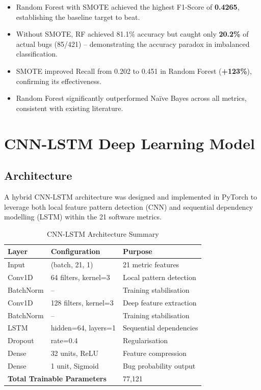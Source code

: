 \documentclass[12pt,a4paper]{article}
\begin{document}
\begin{itemize}[leftmargin=1.5cm]
  \item Random Forest with SMOTE achieved the highest F1-Score of
    \textbf{0.4265}, establishing the baseline target to beat.
  \item Without SMOTE, RF achieved 81.1\% accuracy but caught only
    \textbf{20.2\%} of actual bugs (85/421) -- demonstrating the
    accuracy paradox in imbalanced classification.
  \item SMOTE improved Recall from 0.202 to 0.451 in Random Forest
    (\textbf{+123\%}), confirming its effectiveness.
  \item Random Forest significantly outperformed Naïve Bayes across
    all metrics, consistent with existing literature.
\end{itemize}

\section{CNN-LSTM Deep Learning Model}

\subsection{Architecture}

A hybrid CNN-LSTM architecture was designed and implemented in PyTorch
to leverage both local feature pattern detection (CNN) and sequential
dependency modelling (LSTM) within the 21 software metrics.

\begin{table}[H]
  \centering
  \caption{CNN-LSTM Architecture Summary}
  \begin{tabular}{lll}
    \toprule
    \textbf{Layer} & \textbf{Configuration} & \textbf{Purpose} \\
    \midrule
    Input         & (batch, 21, 1)              & 21 metric features \\
    Conv1D        & 64 filters, kernel=3        & Local pattern detection \\
    BatchNorm     & --                          & Training stabilisation \\
    Conv1D        & 128 filters, kernel=3       & Deep feature extraction \\
    BatchNorm     & --                          & Training stabilisation \\
    LSTM          & hidden=64, layers=1         & Sequential dependencies \\
    Dropout       & rate=0.4                    & Regularisation \\
    Dense         & 32 units, ReLU              & Feature compression \\
    Dense         & 1 unit, Sigmoid             & Bug probability output \\
    \midrule
    \multicolumn{2}{l}{\textbf{Total Trainable Parameters}} & 77,121 \\
    \bottomrule
  \end{tabular}
\end{table}
\end{document}
